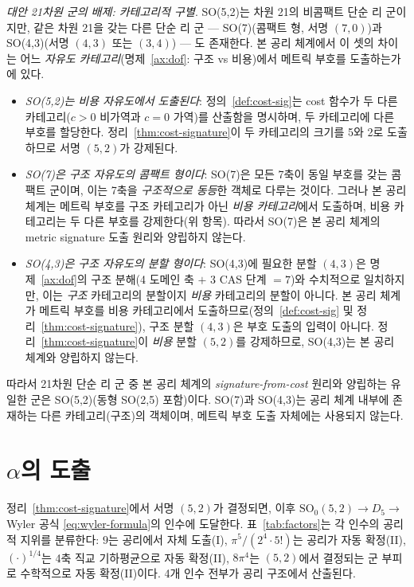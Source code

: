 \documentclass[entropy,article,submit,pdftex,oneauthor]{Definitions/mdpi}
\begin{document}
\textit{대안 21차원 군의 배제: 카테고리적 구별}. SO(5,2)는 차원 21의 비콤팩트 단순 리 군이지만, 같은 차원 21을 갖는 다른 단순 리 군 — SO(7)(콤팩트 형, 서명 $(7,0)$)과 SO(4,3)(서명 $(4,3)$ 또는 $(3,4)$) — 도 존재한다. 본 공리 체계에서 이 셋의 차이는 어느 \emph{자유도 카테고리}(명제~\ref{ax:dof}: 구조 vs 비용)에서 메트릭 부호를 도출하는가에 있다.

\begin{itemize}
\item \emph{SO(5,2)는 \emph{비용 자유도}에서 도출된다}: 정의~\ref{def:cost-sig}는 cost 함수가 두 다른 카테고리($c > 0$ 비가역과 $c = 0$ 가역)를 산출함을 명시하며, 두 카테고리에 다른 부호를 할당한다. 정리~\ref{thm:cost-signature}이 두 카테고리의 크기를 5와 2로 도출하므로 서명 $(5,2)$가 강제된다.

\item \emph{SO(7)은 \emph{구조 자유도}의 콤팩트 형이다}: SO(7)은 모든 7축이 동일 부호를 갖는 콤팩트 군이며, 이는 7축을 \emph{구조적으로 동등}한 객체로 다루는 것이다. 그러나 본 공리 체계는 메트릭 부호를 구조 카테고리가 아닌 \emph{비용 카테고리}에서 도출하며, 비용 카테고리는 두 다른 부호를 강제한다(위 항목). 따라서 SO(7)은 본 공리 체계의 metric signature 도출 원리와 양립하지 않는다.

\item \emph{SO(4,3)은 \emph{구조 자유도}의 분할 형이다}: SO(4,3)에 필요한 분할 $(4,3)$은 명제~\ref{ax:dof}의 구조 분해(4 도메인 축 $+$ 3 CAS 단계 $= 7$)와 수치적으로 일치하지만, 이는 \emph{구조} 카테고리의 분할이지 \emph{비용} 카테고리의 분할이 아니다. 본 공리 체계가 메트릭 부호를 비용 카테고리에서 도출하므로(정의~\ref{def:cost-sig} 및 정리~\ref{thm:cost-signature}), 구조 분할 $(4,3)$은 부호 도출의 입력이 아니다. 정리~\ref{thm:cost-signature}이 \emph{비용} 분할 $(5,2)$를 강제하므로, SO(4,3)는 본 공리 체계와 양립하지 않는다.
\end{itemize}

따라서 21차원 단순 리 군 중 본 공리 체계의 \emph{signature-from-cost} 원리와 양립하는 유일한 군은 SO(5,2)(동형 SO(2,5) 포함)이다. SO(7)과 SO(4,3)는 공리 체계 내부에 존재하는 다른 카테고리(구조)의 객체이며, 메트릭 부호 도출 자체에는 사용되지 않는다.

\section{$\alpha$의 도출}
\label{sec:derivation}

정리~\ref{thm:cost-signature}에서 서명 $(5,2)$가 결정되면, 이후 $\mathrm{SO}_0(5,2) \to D_5 \to$ Wyler 공식 \eqref{eq:wyler-formula}의 인수에 도달한다. 표~\ref{tab:factors}는 각 인수의 공리적 지위를 분류한다: $9$는 공리에서 자체 도출(I), $\pi^5/(2^4 \cdot 5!)$는 공리가 자동 확정(II), $(\cdot)^{1/4}$는 4축 직교 기하평균으로 자동 확정(II), $8\pi^4$는 $(5,2)$에서 결정되는 군 부피로 수학적으로 자동 확정(II)이다. 4개 인수 전부가 공리 구조에서 산출된다.
\end{document}

